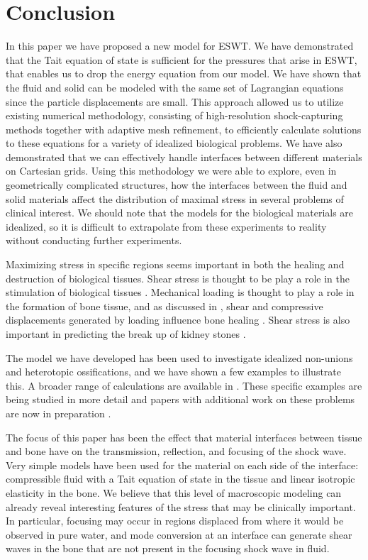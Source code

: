 \documentclass{article}
\begin{document}
\section{Conclusion}
In this paper we have proposed a new model for ESWT.  We have demonstrated that the Tait 
equation of state is sufficient for the pressures that arise in ESWT, that enables us to drop the energy equation from our model.  We have shown that the fluid and 
solid can be modeled with the same set of Lagrangian equations since the particle displacements are 
small.  This approach allowed us to utilize existing numerical methodology, consisting of 
high-resolution shock-capturing methods together with adaptive mesh refinement, to efficiently 
calculate solutions to these equations for a variety of idealized biological problems.  We have 
also demonstrated that we can effectively handle interfaces between different materials on Cartesian 
grids.  Using this methodology we were able to explore, even in geometrically complicated structures, 
how the interfaces between the fluid and solid materials  affect the distribution of maximal 
stress in several problems of clinical interest.  We should note that the models for the biological materials are idealized, so it is difficult to extrapolate from these experiments to reality without conducting further experiments. 

Maximizing stress in specific regions seems important in both the
healing and destruction of biological tissues.  Shear stress is
thought to be play a role in the stimulation of biological
tissues \cite{eswt_vegf,frangos,freund,goodship1985,claes1999,lacroix2002,park1998}.  
Mechanical loading is thought 
to play a role in the formation of bone tissue, and as discussed in , 
shear and compressive displacements generated by loading influence bone healing 
\cite{park1998,prendergast1997,lacroix2002,claes1999,isaksson2006,carter1998,goodship1985}.  
Shear stress is also important in predicting the break up of kidney stones \cite{bailey_oleg}.

The model we have developed has been used to investigate idealized non-unions and 
heterotopic ossifications, and we have shown a few examples to illustrate this.  
A broader range of calculations are available in \cite{fagnan:phd}.  These specific examples are
 being studied in more detail and papers with additional work on these problems are now in 
 preparation \cite{kfagnan_mchang_ho, amath_apl_nonunion}.
  
The focus of this paper has been the effect that material interfaces between
tissue and bone have on the transmission, reflection, and 
focusing of the shock wave.  Very simple models have been used for the
material on each side of the interface: compressible fluid with a Tait
equation of state in the tissue and linear isotropic elasticity in the bone.
We believe that this level of macroscopic modeling can already reveal
interesting features of the stress that may be clinically important.  In
particular, focusing may occur in regions displaced from where it would be
observed in pure water, and mode conversion at an interface can generate
shear waves in the bone that are not present in the focusing shock
wave in fluid.
\end{document}
